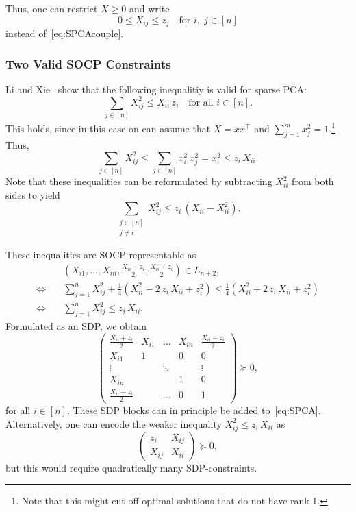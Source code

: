 \documentclass[10pt, a4paper]{article}
\newcommand{\T}{^{\top}}
\begin{document}
Thus, one can restrict $X \geq 0$ and write
\[
  0 \leq X_{ij} \leq z_j \quad \text{for } i,\; j \in [n]
\]
instead of~\eqref{eq:SPCAcouple}.

\subsubsection{Two Valid SOCP Constraints}

Li and Xie~\cite{LiX20} show that the following inequalitiy is valid for
sparse PCA:
\[
  \sum_{j \in [n]} X_{ij}^2 \leq X_{ii}\, z_i \quad\text{for all } i \in [n].
\]
This holds, since in this case on can assume that $X = x x\T$ and $\sum_{j=1}^m x_j^2 =
1$.\footnote{Note that this might cut off optimal solutions that do not
  have rank 1.} Thus,
\[
  \sum_{j \in [n]} X_{ij}^2 \leq \sum_{j \in [n]} x_i^2\, x_j^2 = x_i^2
  \leq z_i\, X_{ii}.
\]
Note that these inequalities can be reformulated by subtracting $X_{ii}^2$
from both sides to yield
\[
  \sum_{\substack{j \in [n]\\ j \neq i}} X_{ij}^2 \leq z_i\, (X_{ii} - X_{ii}^2).
\]


These inequalities are SOCP representable as
\begin{align*}
  & (X_{i1}, \dots, X_{in}, \tfrac{X_{ii} - z_i}{2}, \tfrac{X_{ii} + z_i}{2}) \in L_{n+2},\\
  \Leftrightarrow\quad & \sum_{j=1}^n X_{ij}^2 + \tfrac{1}{4}(X_{ii}^2 - 2\,
                    z_i\, X_{ii} + z_i^2) \leq \tfrac{1}{4}(X_{ii}^2 + 2\, z_i\, X_{ii} + z_i^2)\\
  \Leftrightarrow\quad & \sum_{j=1}^n X_{ij}^2 \leq z_i\, X_{ii}.
\end{align*}
Formulated as an SDP, we obtain
\[
  \begin{pmatrix}
    \tfrac{X_{ii} + z_i}{2} & X_{i1} & \dots & X_{in} & \tfrac{X_{ii} - z_i}{2}\\
    X_{i1} & 1 &  & 0 & 0\\
    \vdots & & \ddots & & \vdots\\
    X_{in} & &    & 1 & 0\\
    \tfrac{X_{ii} - z_i}{2} & & \dots & 0 & 1
  \end{pmatrix}
  \succeq 0,
\]
for all $i \in [n]$.  These SDP blocks can in principle be added
to~\eqref{eq:SPCA}. Alternatively, one can encode the weaker inequality
$X_{ij}^2 \leq z_i\, X_{ii}$ as
\[
  \begin{pmatrix}
    z_i & X_{ij}\\
    X_{ij} & X_{ii}
  \end{pmatrix}
  \succeq 0,
\]
but this would require quadratically many SDP-constraints.
\end{document}
